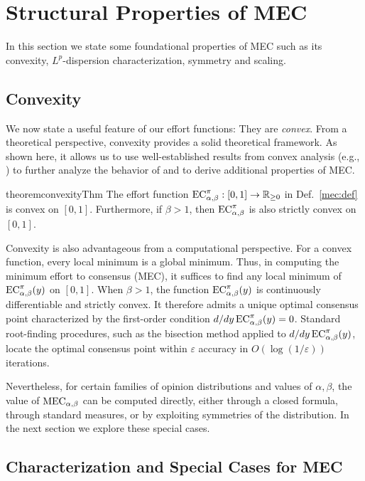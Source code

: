 \section{Structural Properties of MEC}\label{sec:structural}

In this section we state some foundational properties of MEC such as its convexity,  $L^p$-dispersion characterization, symmetry and scaling.

\subsection{Convexity}
We now state a useful feature of our effort functions: They are \emph{convex}.  From a theoretical perspective, convexity provides a solid theoretical framework. As shown here, it allows us to use well-established results from convex analysis (e.g., \cite{Rockafellar1970}) to further analyze the behavior of and to derive additional properties of MEC. 

\begin{restatable}{theorem}{convexityThm}\label{convexity}
The effort function 
$\EC:[0,1] \to \PositiveReals$ 
in Def.~\ref{mec:def} is convex on $[0,1]$. Furthermore, if $\beta>1$, then $\EC$ is also strictly convex on $[0,1]$.
\end{restatable}

Convexity is also advantageous from a computational perspective. For a convex function, every local minimum is a global minimum. Thus, in computing the minimum effort to consensus (MEC), it suffices to find any local minimum of $\EC(y)$ on $[0,1]$. When $\beta>1$, the function $\EC(y)$ is continuously differentiable and strictly convex. It therefore admits a unique optimal consensus point characterized by the first-order condition $d/dy\EC(y)=0$. Standard root-finding procedures, such as the bisection method applied to $d/dy\EC(y)$, locate the optimal consensus point within $\varepsilon$ accuracy in $O(\log(1/\varepsilon))$ iterations.

Nevertheless, for certain families of opinion distributions and values
of $\alpha,\beta$, the value of $\MEC$ can be computed directly, either
through a closed formula, through standard measures, or by exploiting
symmetries of the distribution. In the next section we explore these special cases.  

\subsection{Characterization and Special Cases for MEC}\label{section:special-cases}

